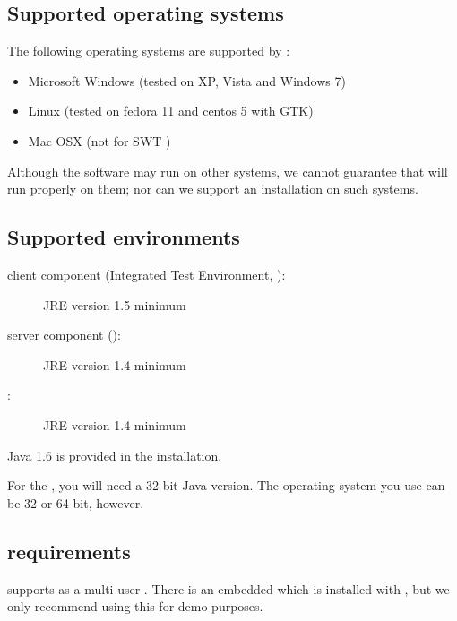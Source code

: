 
\subsection{Supported operating systems}
The following operating systems are supported by \app{}:
\begin{itemize}
  \item Microsoft Windows (tested on XP, Vista and Windows 7)
  \item  Linux (tested on fedora 11 and centos 5 with GTK)
  \item Mac OSX (not for SWT \gdauts{})%

\end{itemize}

Although the software may run on other systems, we cannot guarantee that \app{} will run properly on them; nor can we support an installation on such systems.

\subsection{Supported  environments}
\begin{description}
\item [\app{} client component (Integrated Test Environment, \ite{}):]{JRE version 1.5 minimum}
\item [\app{} server component (\gdagent):]{JRE version 1.4 minimum}
\item [\gdaut{}:]{JRE version 1.4 minimum}
\end{description}
Java 1.6 is provided in the \app{} installation.  

For the \ite{}, you will need a 32-bit Java version. The operating system you use can be 32 or 64 bit, however. 

\subsection{\gdDB requirements}
\app{} supports   as a multi-user \gddb{}. There is an embedded \gddb{} which is installed with \app{}, but we only recommend using this for demo purposes. 

